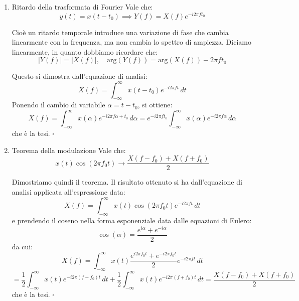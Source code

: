 \begin{enumerate}
\item \begin{theorem}{Ritardo della trasformata di Fourier}
Vale che:
$$
y(t) = x(t - t_0) \implies Y(f) = X(f) e^{-i 2 \pi f t_0}
$$
\end{theorem}

Cioè un ritardo temporale introduce una variazione di fase che cambia linearmente con la frequenza, ma non cambia lo spettro di ampiezza. Diciamo linearmente, in quanto dobbiamo ricordare che:
$$
|Y(f)| = |X(f)|, \quad \mathrm{arg} \left( Y(f) \right) = \mathrm{arg} \left( X(f) \right) - 2 \pi f t_0
$$

Questo si dimostra dall'equazione di analisi:
$$
X(f) = \int_{-\infty}^{\infty} x(t - t_0) e^{-i 2 \pi f t} \, dt
$$
Ponendo il cambio di variabile $\alpha = t - t_0$, si ottiene:
$$
X(f) = \int_{-\infty}^{\infty} x(\alpha) e^{-i 2 \pi f \alpha + t_0} \, d \alpha = e^{-i 2 \pi f t_0} \int_{-\infty}^{\infty} x(\alpha) e^{-i 2 \pi f \alpha} \, d \alpha
$$
che è la tesi. \hfill $\square$

\item \begin{theorem}{Teorema della modulazione}
Vale che:
$$
x(t) \cos(2 \pi f_0 t) \rightarrow \frac{X(f - f_0) + X(f + f_0)}{2}
$$
\end{theorem}
Dimostriamo quindi il teorema. Il risultato ottenuto si ha dall'equazione di analisi applicata all'espressione data:
$$
X(f) = \int_{-\infty}^{\infty} x(t) \cos(2 \pi f_0 t) e^{-i 2 \pi f t} \, dt
$$
e prendendo il coseno nella forma esponenziale data dalle equazioni di Eulero:
$$
\cos(\alpha) = \frac{e^{i\alpha} + e ^{-i\alpha}}{2}
$$
da cui:
$$
X(f) = \int_{-\infty}^{\infty} x(t) \frac{e^{i 2\pi f_0 t} + e^{-i 2 \pi f_0 t}}{2} e^{-i 2 \pi f t} \, dt 
$$
$$
= \frac{1}{2} \int_{-\infty}^{\infty} x(t) e^{-i 2 \pi (f - f_0) t} \, dt + \frac{1}{2} \int_{-\infty}^{\infty} x(t) e^{-i 2 \pi (f + f_0) t} \, dt = \frac{X(f - f_0) + X(f + f_0)}{2}
$$
che è la tesi. \hfill $\square$

\end{enumerate}
